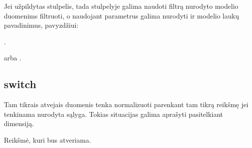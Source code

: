 \documentclass[letterpaper,10pt,lithuanian]{sphinxmanual}
\begin{document}
\sphinxAtStartPar
Jei užpildytas {\hyperref[\detokenize{dimensijos:param.source}]{}} stulpelis, tada {\hyperref[\detokenize{dimensijos:param.prepare}]{}}
stulpelyje galima naudoti filtrą nurodyto {\hyperref[\detokenize{dimensijos:param.source}]{}} modelio duomenims
filtruoti, o naudojant parametrus galima nurodyti ir modelio laukų pavadinimus,
pavyzdžiui:
\begin{description}
\sphinxAtStartPar
{}.

\sphinxAtStartPar
{} arba .

\end{description}


\subsection{switch}
\label{\detokenize{dimensijos:switch}}\label{\detokenize{dimensijos:id13}}\label{\detokenize{dimensijos:module-switch}}
\sphinxAtStartPar
Tam tikrais atvejais duomenis tenka normalizuoti parenkant tam tikrą reikšmę jei
tenkinama nurodyta sąlyga. Tokias situacijas galima aprašyti pasitelkiant
{\hyperref[\detokenize{formules:switch}]{}} dimensiją.

\begin{fulllineitems}
\label{\detokenize{dimensijos:switch.switch.source}}
\pysigstartsignatures
\pysigline
{}
\pysigstopsignatures
\sphinxAtStartPar
Reikšmė, kuri bus atveriama.

\end{fulllineitems}

\end{document}
